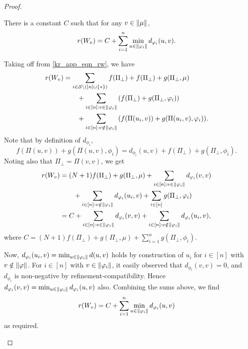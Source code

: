 \begin{proof}
    \begin{claim}
        \label{kr_app_claim_rv}
        There is a constant $C$ such that for any $v \in \|{\mu}\|$,
        \[
            r(W_v)
            = C + \sum_{i=1}^{n}{
                \min_{u \in \|{\varphi_i}\|}{
                    d_{\varphi_i}(u, v)
                }
            }.
        \]
    \end{claim}
    \begin{claimproof}
        Taking off from \cref{kr_app_eqn_rw}, we have
        \begin{align*}
            r(W_v)
            &= \sum_{i \in \mathcal{S} \setminus ([n] \cup \{\ast\})}{f(\Pi_\bot)}
                + f(\Pi_\bot)
                + g(\Pi_\bot, \mu) \\
                &\quad\quad + \sum_{i \in [n]: v \in \|{\varphi_i}\|}{
                   \left(
                        f(\Pi_\bot) + g(\Pi_\bot, \varphi_i)
                   \right)
                } \\
                &\quad\quad + \sum_{i \in [n]: v \notin \|{\varphi_i}\|}{
                   \left(
                        f(\Pi(u_i, v)) + g(\Pi(u_i, v), \varphi_i)
                   \right)
                }.
        \end{align*}
        Note that by definition of $d_{\phi_i}$,
        \[
            f(\Pi(u, v)) + g(\Pi(u, v), \phi_i)
            = d_{\phi_i}(u, v) + f(\Pi_\bot) + g(\Pi_\bot, \phi_i).
        \]
        Noting also that $\Pi_\bot = \Pi(v, v)$, we get
        \begin{align*}
            r(W_v)
            &= (N + 1)f(\Pi_\bot)
                + g(\Pi_\bot, \mu)
                + \sum_{i \in [n]: v \in \|{\varphi_i}\|}{
                    d_{\varphi_i}(v, v)
                } \\
                &\qquad + \sum_{i \in [n]: v \notin \|{\varphi_i}\|}{
                    d_{\varphi_i}(u_i, v)
                }
                + \sum_{i \in [n]}{
                    g(\Pi_\bot, \varphi_i)
                } \\
            &= C + \sum_{i \in [n]: v \in \|{\varphi_i}\|}{
                    d_{\varphi_i}(v, v)
                }
                + \sum_{i \in [n]: v \notin \|{\varphi_i}\|}{
                    d_{\varphi_i}(u_i, v)
                },
        \end{align*}
        where $C = (N + 1)f(\Pi_\bot) + g(\Pi_\bot, \mu) +
        \sum_{i=1}^{n}{g(\Pi_\bot, \phi_i)}$.

        Now, $d_{\varphi_i}(u_i, v) = \min_{u \in \|{\varphi_i}\|}{d(u, v)}$
        holds by construction of $u_i$ for $i \in [n]$ with $v \notin
        \|{\varphi}\|$. For $i \in [n]$ with $v \in \|{\varphi_i}\|$, it
        easily observed that $d_{\phi_i}(v, v) = 0$, and $d_{\phi_i}$ is
        non-negative by refinement-compatibility. Hence $d_{\varphi_i}(v, v) =
        \min_{u \in \|{\varphi_i}\|}{d_{\varphi_i}(u, v)}$ also. Combining the
        sums above, we find
        \[
            r(W_v) = C + \sum_{i=1}^{n}{\min_{u \in
            \|{\varphi_i}\|}{d_{\varphi_i}(u, v)}}
        \]
        as required.
    \end{claimproof}


\end{proof}
